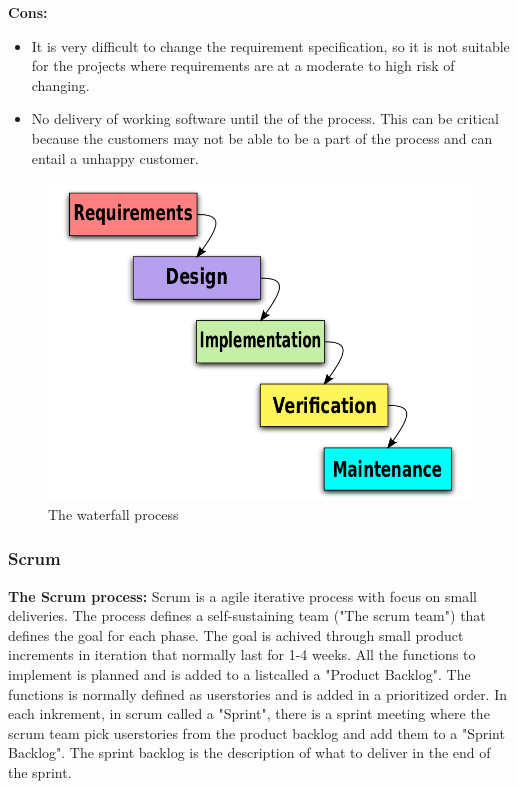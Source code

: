 {\bf Cons: }
\begin{itemize}
	\item It is very difficult to change the requirement specification, so it is not suitable for the projects where requirements are at a moderate to high risk of changing.
	\item No delivery of working software until the of the process. This can be critical because the customers may not
	be able to be a part of the process and can entail a unhappy customer.
\end{itemize}

\begin{figure}[!ht]
\centering
\includegraphics[scale=0.3]{pictures/Waterfall_model.png}
\caption{The waterfall process}
\label{overflow}
\end{figure}


\subsubsection{Scrum}
{\bf The Scrum process: } Scrum is a agile iterative process with focus on small deliveries. The process
defines a self-sustaining team ("The scrum team") that defines the goal for each phase. The goal 
is achived through small product increments in iteration that normally last for 1-4 weeks. 
All the functions to implement is planned and is added to a listcalled a "Product Backlog". The
functions is normally defined as userstories and is added in a prioritized order. In each inkrement, 
in scrum called a "Sprint", there is a sprint meeting where the scrum team pick userstories from the 
product backlog and add them to a "Sprint Backlog". The sprint backlog is the description of what 
to deliver in the end of the sprint.

